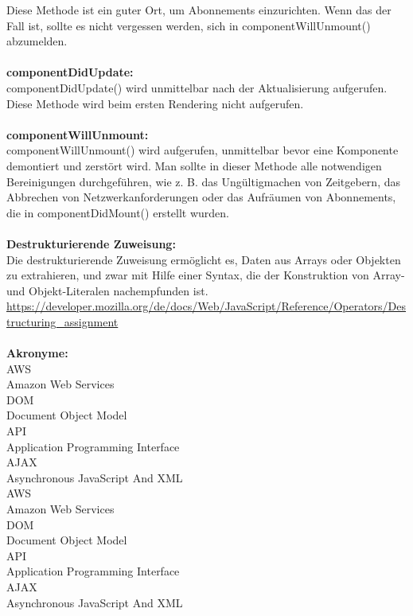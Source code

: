 Diese Methode ist ein guter Ort, um Abonnements einzurichten. Wenn das der Fall ist, sollte es nicht vergessen werden, sich in componentWillUnmount() abzumelden.
\\\\
\textbf{componentDidUpdate:}\\
componentDidUpdate() wird unmittelbar nach der Aktualisierung aufgerufen. Diese Methode wird beim ersten Rendering nicht aufgerufen.
\\\\
\textbf{componentWillUnmount:}\\
componentWillUnmount() wird aufgerufen, unmittelbar bevor eine Komponente demontiert und zerstört wird. Man sollte in dieser Methode alle notwendigen Bereinigungen durchgeführen, wie z. B. das Ungültigmachen von Zeitgebern, das Abbrechen von Netzwerkanforderungen oder das Aufräumen von Abonnements, die in componentDidMount() erstellt wurden.
\\\\
\textbf{Destrukturierende Zuweisung:}\\
Die destrukturierende Zuweisung ermöglicht es, Daten aus Arrays oder Objekten zu extrahieren, und zwar mit Hilfe einer Syntax, die der Konstruktion von Array- und Objekt-Literalen nachempfunden ist.
\url{https://developer.mozilla.org/de/docs/Web/JavaScript/Reference/Operators/Destructuring_assignment}
\\\\
\textbf{Akronyme:}\\
{AWS}\\{Amazon Web Services}\\
{DOM}\\{Document Object Model}\\
{API}\\{Application Programming Interface}\\
{AJAX}\\{Asynchronous JavaScript And XML}\\
{AWS}\\{Amazon Web Services}\\
{DOM}\\{Document Object Model}\\
{API}\\{Application Programming Interface}\\
{AJAX}\\{Asynchronous JavaScript And XML}\\

